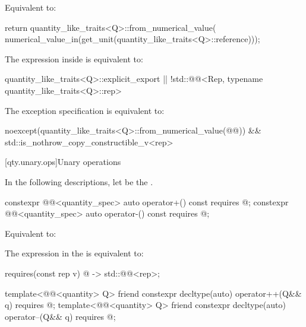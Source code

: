\begin{itemdescr}
\pnum
\effects
Equivalent to:
\begin{codeblock}
return quantity_like_traits<Q>::from_numerical_value(
  numerical_value_in(get_unit(quantity_like_traits<Q>::reference)));
\end{codeblock}

\pnum
\remarks
The expression inside  is equivalent to:
\begin{codeblock}
quantity_like_traits<Q>::explicit_export ||
  !std::@@<Rep, typename quantity_like_traits<Q>::rep>
\end{codeblock}
The exception specification is equivalent to:
\begin{codeblock}
noexcept(quantity_like_traits<Q>::from_numerical_value(@@)) &&
  std::is_nothrow_copy_constructible_v<rep>
\end{codeblock}
\end{itemdescr}

[qty.unary.ops]{Unary operations}

\pnum
In the following descriptions,
let  be the .

\begin{itemdecl}
constexpr @@<quantity_spec> auto operator+() const
  requires @\seebelownc@;
constexpr @@<quantity_spec> auto operator-() const
  requires @\seebelownc@;
\end{itemdecl}

\begin{itemdescr}
\pnum
\effects
Equivalent to:

\pnum
\remarks
The expression in the  is equivalent to:
\begin{codeblock}
requires(const rep v) {
  { @\atsign@v } -> std::@@<rep>;
}
\end{codeblock}
\end{itemdescr}

\begin{itemdecl}
template<@@<quantity> Q>
friend constexpr decltype(auto) operator++(Q&& q)
  requires @\seebelownc@;
template<@@<quantity> Q>
friend constexpr decltype(auto) operator--(Q&& q)
  requires @\seebelownc@;
\end{itemdecl}

